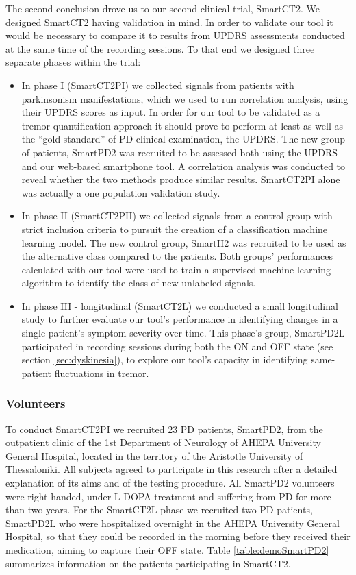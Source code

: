 The second conclusion drove us to our second clinical trial, \gls{SmartCT2}. We designed \gls{SmartCT2} having validation in mind. In order to validate our tool it would be necessary to compare it to results from \gls{UPDRS} assessments conducted at the same time of the recording sessions. To that end we designed three separate phases within the trial:

\begin{itemize}
\item In phase I (\gls{SmartCT2PI}) we collected signals from patients with parkinsonism manifestations, which we used to run correlation analysis, using their \gls{UPDRS} scores as input. In order for our tool to be validated as a tremor quantification approach it should prove to perform at least as well as the ``gold standard'' of \gls{PD} clinical examination, the \gls{UPDRS}. The new group of patients, \gls{SmartPD2} was recruited to be assessed both using the \gls{UPDRS} and our web-based smartphone tool. A correlation analysis was conducted to reveal whether the two methods produce similar results. \gls{SmartCT2PI} alone was actually a one population validation study. 
\item In phase II (\gls{SmartCT2PII}) we collected signals from a control group with strict inclusion criteria to pursuit the creation of a classification machine learning model. The new control group, \gls{SmartH2} was recruited to be used as the alternative class compared to the patients. Both groups' performances calculated with our tool were used to train a supervised machine learning algorithm to identify the class of new unlabeled signals. 
\item In phase III - longitudinal (\gls{SmartCT2L}) we conducted a small longitudinal study to further evaluate our tool's performance in identifying changes in a single patient's symptom severity over time. This phase's group, \gls{SmartPD2L} participated in recording sessions during both the ON and OFF state (see section \ref{sec:dyskinesia}), to explore our tool's capacity in identifying same-patient fluctuations in tremor.
\end{itemize}

\subsubsection{Volunteers}
\label{subsubsec:smartCT2Volunteers}
To conduct \gls{SmartCT2PI} we recruited 23 \gls{PD} patients, \gls{SmartPD2}, from the outpatient clinic of the 1st Department of Neurology of AHEPA University General Hospital, located in the territory of the Aristotle University of Thessaloniki. All subjects agreed to participate in this research after a detailed explanation of its aims and of the testing procedure. All \gls{SmartPD2} volunteers were right-handed, under L-DOPA treatment and suffering from \gls{PD} for more than two years.
For the \gls{SmartCT2L} phase we recruited two \gls{PD} patients, \gls{SmartPD2L} who were hospitalized overnight in the AHEPA University General Hospital, so that they could be recorded in the morning before they received their medication, aiming to capture their OFF state. Table \ref{table:demoSmartPD2} summarizes information on the patients participating in \gls{SmartCT2}. 

